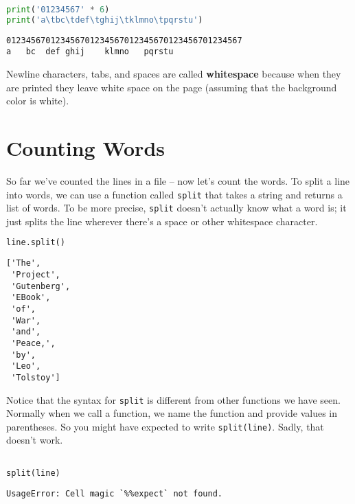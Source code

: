 \begin{lstlisting}[language=Python,style=source]
print('01234567' * 6)
print('a\tbc\tdef\tghij\tklmno\tpqrstu')
\end{lstlisting}

\begin{lstlisting}[style=output]
012345670123456701234567012345670123456701234567
a   bc  def ghij    klmno   pqrstu
\end{lstlisting}

Newline characters, tabs, and spaces are called \textbf{whitespace}
because when they are printed they leave white space on the page
(assuming that the background color is white).

\hypertarget{counting-words}{%
\section{Counting Words}\label{counting-words}}

So far we've counted the lines in a file -- now let's count the words.
To split a line into words, we can use a function called
\passthrough{\lstinline!split!} that takes a string and returns a list
of words. To be more precise, \passthrough{\lstinline!split!} doesn't
actually know what a word is; it just splits the line wherever there's a
space or other whitespace character.

\begin{lstlisting}[language=Python,style=source]
line.split()
\end{lstlisting}

\begin{lstlisting}[style=output]
['The',
 'Project',
 'Gutenberg',
 'EBook',
 'of',
 'War',
 'and',
 'Peace,',
 'by',
 'Leo',
 'Tolstoy']
\end{lstlisting}

Notice that the syntax for \passthrough{\lstinline!split!} is different
from other functions we have seen. Normally when we call a function, we
name the function and provide values in parentheses. So you might have
expected to write \passthrough{\lstinline!split(line)!}. Sadly, that
doesn't work.

\begin{lstlisting}[language=Python,style=source]
%%expect NameError

split(line)
\end{lstlisting}

\begin{lstlisting}[style=output]
UsageError: Cell magic `%%expect` not found.
\end{lstlisting}

